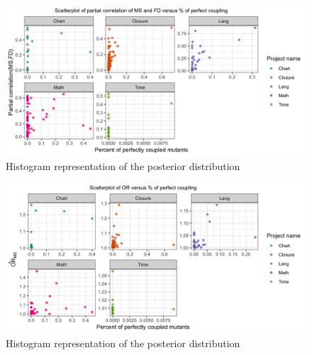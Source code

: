 \documentclass[10pt,letterpaper]{article}
\begin{document}
  
    \begin{figure}[ht!]
        \centering
        \includegraphics[scale=0.15]{figures/couple_partial_cor.png}
        \caption{Histogram representation of the posterior distribution}
        \label{fig:par_cor_ms_scatter}
    \end{figure}



  \begin{figure}[ht!]
        \centering
        \includegraphics[scale=0.15]{figures/couple_OR.png}
        \caption{Histogram representation of the posterior distribution}
        \label{fig:par_cor_ms_scatter}
    \end{figure}






\end{document}
